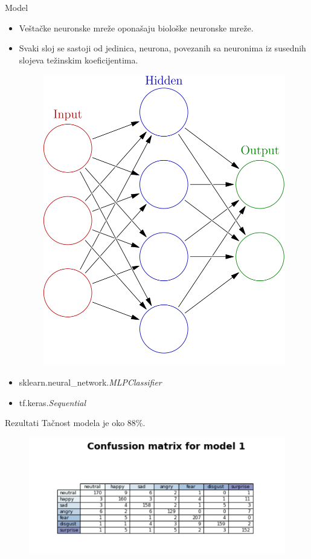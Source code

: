 \documentclass{beamer}
\begin{document}
\begin{frame}{Model}
    \begin{itemize}
        \item Veštačke neuronske mreže oponašaju biološke neuronske mreže. 
        \item Svaki sloj se sastoji od jedinica, neurona, povezanih sa neuronima iz susednih slojeva težinskim koeficijentima.
        \begin{figure}[h]
        \includegraphics[scale=0.1]{nn.png}
        \end{figure}
        \item sklearn.neural\_network.\textit{MLPClassifier}
        \item tf.keras.\textit{Sequential} 
    \end{itemize}
\end{frame}

\begin{frame}{Rezultati}
Tačnost modela je oko 88\%.
\begin{figure}[t]
\centering
\includegraphics[scale=0.5]{matrix1.png}
\end{figure}    
\end{frame}
\end{document}
